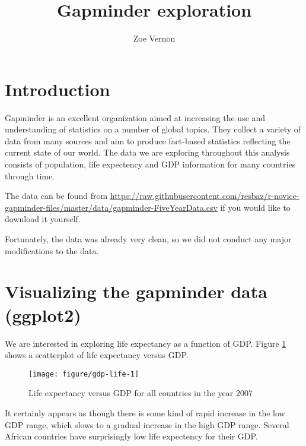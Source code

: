 \documentclass[english]{article}\usepackage[]{graphicx}\usepackage[]{color}
\title{Gapminder exploration}
\author{Zoe Vernon}
\makeatletter
\def\maxwidth{ %
  \ifdim\Gin@nat@width>\linewidth
    \linewidth
  \else
    \Gin@nat@width
  \fi
}
\newenvironment{knitrout}{}{} %
\makeatother
\begin{document}
\maketitle

\section{Introduction}
Gapminder is an excellent organization aimed at increasing the use and understanding of statistics on a number of global topics. They collect a variety of data from many sources and aim to produce fact-based statistics reflecting the current state of our world. The data we are exploring throughout this analysis consists of population, life expectency and GDP information for many countries through time.

The data can be found from \url{https://raw.githubusercontent.com/resbaz/r-novice-gapminder-files/master/data/gapminder-FiveYearData.csv} if you would like to download it yourself.





Fortunately, the data was already very clean, so we did not conduct any major modifications to the data.





\section{Visualizing the gapminder data (ggplot2)}


We are interested in exploring life expectancy as a function of GDP. Figure \ref{fig:gdp-life} shows a scatterplot of life expectancy versus GDP.

\begin{knitrout}
\color{fgcolor}\begin{figure}[H]

{\centering \texttt{[image: figure/gdp-life-1]} 

}

\caption[Life expectancy versus GDP for all countries in the year 2007]{Life expectancy versus GDP for all countries in the year 2007}\label{fig:gdp-life}
\end{figure}


\end{knitrout}


It certainly appears as though there is some kind of rapid increase in the low GDP range, which slows to a gradual increase in the high GDP range. Several African countries have surprisingly low life expectency for their GDP.
\end{document}
